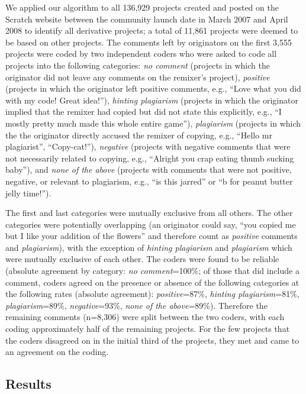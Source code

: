 We applied our algorithm to all 136,929 projects created and posted on the
Scratch website between the community launch date in March 2007 and
April 2008 to identify all derivative projects;
a total of 11,861 projects were deemed to be based on other projects.
The comments left by originators on the first
3,555 projects were coded by two independent coders who were asked to
code all projects into the following categories: {\em no comment}
(projects in which the originator did not leave any comments on the
remixer's project), {\em positive} (projects in which the originator
left positive comments, e.g., ``Love what you did with my code! Great
idea!''), {\em hinting plagiarism} (projects in which the originator
implied that the remixer had copied but did not state this explicitly,
e.g., ``I mostly pretty much made this whole entire game''), {\em
plagiarism} (projects in which the the originator directly accused the
remixer of copying, e.g., ``Hello mr plagiarist”, ``Copy-cat!''), {\em
negative} (projects with negative comments that were not necessarily
related to copying, e.g., ``Alright you crap eating thumb sucking
baby''), and {\em none of the above} (projects with comments that were
not positive, negative, or relevant to plagiarism, e.g., ``is this
jarred'' or ``b for peanut butter jelly time!'').

The first and last categories were mutually exclusive from all others.
The other categories were potentially overlapping (an originator could
say, ``you copied me but I like your addition of the flowers'' and
therefore count as {\em positive} comments and {\em plagiarism}), with
the exception of {\em hinting plagiarism} and {\em plagiarism} which were mutually exclusive of each other. The coders were found to be reliable (absolute
agreement by category: {\em no comment}=100\%; of those that did include
a comment, coders agreed on the presence or absence of the following
categories at the following rates (absolute agreement): {\em
positive}=87\%, {\em hinting plagiarism}=81\%, {\em plagiarism}=89\%,
{\em negative}=93\%, {\em none of the above}=89\%). Therefore the
remaining comments (n=8,306) were split between the two coders, with
each coding approximately half of the remaining projects. For the few
projects that the coders disagreed on in the initial third of the
projects, they met and came to an agreement on the coding.


\subsection{Results}

